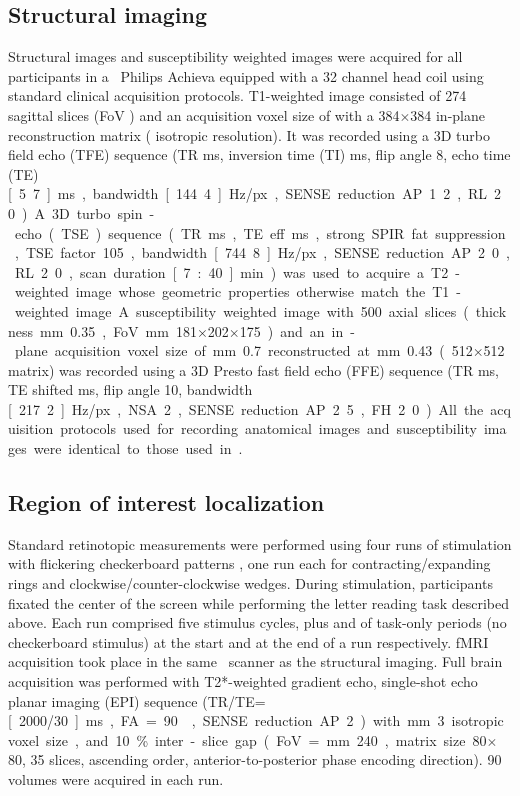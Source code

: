 \subsection*{Structural imaging}

\noindent Structural images and susceptibility weighted images were acquired
for all participants in a \threeT\ Philips Achieva equipped with a 32 channel
head coil using standard clinical acquisition protocols. T1-weighted image
consisted of 274 sagittal slices (FoV ) and an
acquisition voxel size of  with a 384$\times$384 in-plane
reconstruction matrix ( isotropic resolution). It was recorded using a
3D turbo field echo (TFE) sequence (TR \unit[2500]{ms}, inversion time (TI)
\unit[900]{ms}, flip angle 8\textdegree, echo time (TE) \unit[5.7]{ms},
bandwidth \unit[144.4]{Hz/px}, SENSE reduction AP 1.2, RL 2.0). A 3D turbo
spin-echo (TSE) sequence (TR \unit[2500]{ms}, TE eff \unit[230]{ms}, strong
SPIR fat suppression, TSE factor 105, bandwidth \unit[744.8]{Hz/px}, SENSE
reduction AP 2.0, RL 2.0, scan duration \unit[7:40]{min}) was used to acquire a
T2-weighted image whose geometric properties otherwise match the T1-weighted
image. A susceptibility weighted image with 500 axial slices (thickness
\mm{0.35}, FoV \mm{181$\times$202$\times$175}) and an in-plane acquisition
voxel size of \mm{0.7} reconstructed at \mm{0.43} (512$\times$512 matrix) was
recorded using a 3D Presto fast field echo (FFE) sequence (TR \unit[19]{ms}, TE
shifted \unit[26]{ms}, flip angle 10\textdegree, bandwidth \unit[217.2]{Hz/px},
NSA 2, SENSE reduction AP 2.5, FH 2.0). All the acquisition protocols used for
recording anatomical images and susceptibility images were identical to those
used in \citet{hanke_2014}.

\subsection*{Region of interest localization}

\noindent Standard retinotopic measurements were performed using four runs of
stimulation with flickering checkerboard patterns \citep{warnking_2002}, one
run each for contracting/expanding rings and clockwise/counter-clockwise
wedges. During stimulation, participants fixated the center of the screen while
performing the letter reading task described above. Each run comprised five
stimulus cycles, plus  and  of task-only periods (no
checkerboard stimulus) at the start and at the end of a run respectively. fMRI
acquisition took place in the same \threeT\ scanner as the structural imaging.
Full brain acquisition was performed with T2*-weighted gradient echo,
single-shot echo planar imaging (EPI) sequence (TR/TE=\unit[2000/30]{ms},
FA=90\textdegree, SENSE reduction AP 2) with \mm{3} isotropic voxel size, and
10\% inter-slice gap (FoV=\mm{240}, matrix size 80$\times$80, 35 slices,
ascending order, anterior-to-posterior phase encoding direction). 90 volumes
were acquired in each run.

